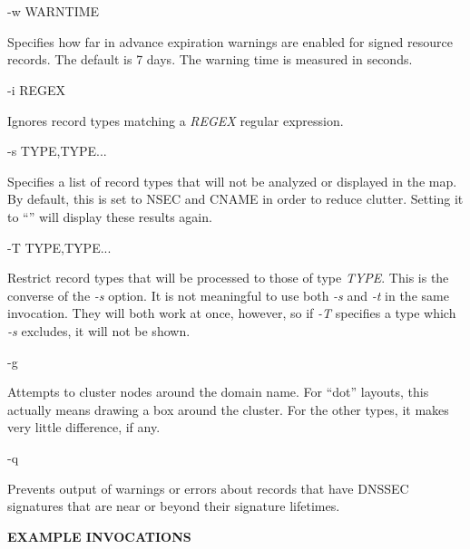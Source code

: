\begin{description}
\item -w WARNTIME\verb" "

Specifies how far in advance expiration warnings are enabled for signed 
resource records.  The default is 7 days.  The warning time is measured
in seconds.

\item -i REGEX\verb" "

Ignores record types matching a {\it REGEX} regular expression.

\item -s TYPE,TYPE...\verb" "

Specifies a list of record types that will not be analyzed or displayed
in the map.  By default, this is set to NSEC and CNAME in order to reduce
clutter.  Setting it to ``'' will display these results again.

\item -T TYPE,TYPE...\verb" "

Restrict record types that will be processed to those of type {\it TYPE}.
This is the converse of the {\it -s} option.  It is not meaningful to use both
{\it -s} and {\it -t} in the same invocation.  They will both work at once,
however, so if {\it -T} specifies a type which {\it -s} excludes, it will not
be shown.

\item -g\verb" "

Attempts to cluster nodes around the domain name.  For ``dot'' layouts,
this actually means drawing a box around the cluster.  For the other
types, it makes very little difference, if any.

\item -q\verb" "

Prevents output of warnings or errors about records that have DNSSEC
signatures that are near or beyond their signature lifetimes.

\end{description}

{\bf EXAMPLE INVOCATIONS}

